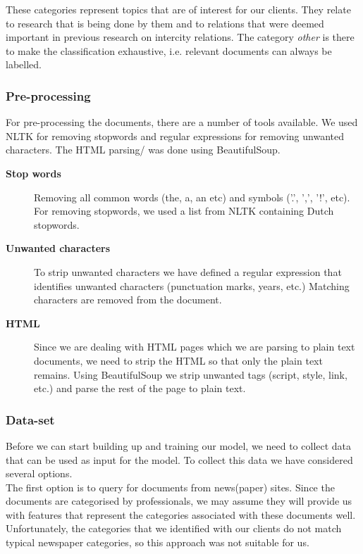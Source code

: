 These categories represent topics that are of interest for our clients. They relate to research that is being done by them and to relations that were deemed important in previous research on intercity relations. The category \textit{other} is there to make the classification exhaustive, i.e. relevant documents can always be labelled.

\subsubsection{Pre-processing}
For pre-processing the documents, there are a number of tools available. We used NLTK \cite{nlkt_stemming} for removing stopwords and regular expressions for removing unwanted characters. The HTML parsing/ was done using BeautifulSoup.

\begin{description}
\item[\textbf{Stop words}]
Removing all common words (the, a, an etc) and symbols ('.', ',', '!', etc). For removing stopwords, we used a list from NLTK containing Dutch stopwords.

\item[\textbf{Unwanted characters}]
To strip unwanted characters we have defined a regular expression that identifies unwanted characters (punctuation marks, years, etc.) Matching characters are removed from the document. 

\item[\textbf{HTML}]
Since we are dealing with HTML pages which we are parsing to plain text documents, we need to strip the HTML so that only the plain text remains. Using BeautifulSoup we strip unwanted tags (script, style, link, etc.) and parse the rest of the page to plain text.
\end{description}

\subsubsection{Data-set}
Before we can start building up and training our model, we need to collect data that can be used as input for the model. To collect this data we have considered several options.\\

The first option is to query for documents from news(paper) sites. Since the documents are categorised by professionals, we may assume they will provide us with features that represent the categories associated with these documents well.
Unfortunately, the categories that we identified with our clients do not match typical newspaper categories, so this approach was not suitable for us.\\

